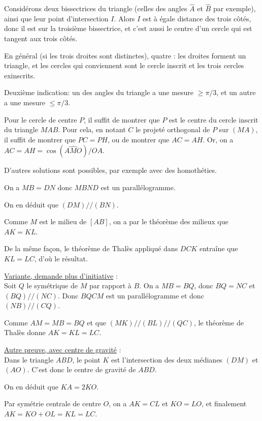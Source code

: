 \begin{Soln}{86}
Considérons deux bissectrices du triangle (celles des angles $\widehat A$ et $\widehat B$ par exemple), ainsi que leur point d'intersection $I$. Alors $I$ est à égale distance des trois côtés, donc il est sur la troisième bissectrice, et c'est aussi le centre d'un cercle qui est tangent aux trois côtés.


\end{Soln}
\begin{Soln}{88}
En général (si les trois droites sont distinctes), quatre : les droites forment un triangle, et les cercles qui conviennent sont le cercle inscrit et les trois cercles exinscrits.
\end{Soln}
\begin{Soln}{90}
Deuxième indication: un des angles du triangle a une mesure $\geq \pi/3$, et un autre a une mesure $\leq \pi/3$.
\end{Soln}
\begin{Soln}{94}
Pour le cercle de centre $P$, il suffit de montrer que $P$ est le centre du cercle inscrit du triangle $MAB$. Pour cela, en notant $C$ le projeté orthogonal de $P$ sur $(MA)$, il suffit de montrer que $PC=PH$, ou de montrer que $AC=AH$. Or, on a $AC=AH = \cos(\widehat{AMO}) / OA$.

D'autres solutions sont possibles, par exemple avec des homothéties.
\end{Soln}
\begin{Soln}{95}
\end{Soln}
\begin{Soln}{96}
 On a $MB=DN$ donc $MBND$ est un parallélogramme.

 On en déduit que $(DM)//(BN)$.

 Comme $M$ est le milieu de $[AB]$, on a par le théorème des milieux que $AK=KL$.

 De la même façon, le théorème de Thalès appliqué dans $DCK$ entraîne que $KL=LC$, d'où le résultat.

\underline{Variante, demande plus d'initiative} :\\
Soit $Q$ le symétrique de $M$ par rapport à $B$. On a $MB=BQ$, donc $BQ=NC$ et $(BQ)//(NC)$. Donc $BQCM$ est un parallélogramme et donc $(NB)//(CQ)$.

Comme $AM=MB=BQ$ et que $(MK)//(BL)//(QC)$, le théorème de Thalès donne $AK=KL=LC$.

\underline{Autre preuve, avec centre de gravité} :\\
Dans le triangle $ABD$, le point $K$ est l'intersection des deux médianes $(DM)$ et $(AO)$. C'est donc le centre de gravité de $ABD$.

On en déduit que $KA = 2KO$.

Par symétrie centrale de centre $O$, on a $AK=CL$ et $KO=LO$, et finalement $AK = KO+OL = KL = LC$.
\end{Soln}
